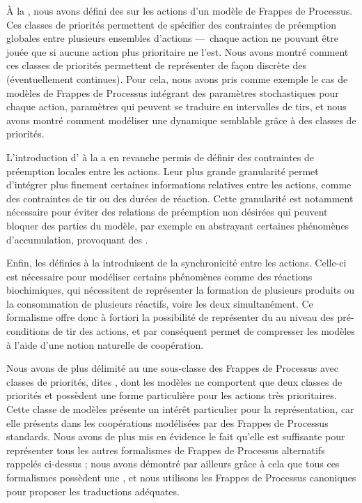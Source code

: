 À la , nous avons défini des  sur les actions
d'un modèle de Frappes de Processus.
Ces classes de priorités permettent de spécifier des contraintes de préemption globales
entre plusieurs ensembles d'actions ---~chaque action ne pouvant être jouée que si
aucune action plus prioritaire ne l'est.
Nous avons montré comment ces classes de priorités permettent de représenter de façon
discrète des  (éventuellement continues).
Pour cela, nous avons pris comme exemple le cas de modèles de Frappes de Processus intégrant
des paramètres stochastiques pour chaque action,
paramètres qui peuvent se traduire en intervalles de tirs,
et nous avons montré comment modéliser une dynamique semblable grâce à des classes de priorités.

L'introduction d' à la  a en revanche permis de définir
des contraintes de préemption locales entre les actions.
Leur plus grande granularité permet d'intégrer plus finement certaines informations
relatives entre les actions, comme des contraintes de tir ou des durées de réaction.
Cette granularité est notamment nécessaire pour éviter des relations de préemption
non désirées qui peuvent bloquer des parties du modèle,
par exemple en abstrayant certaines phénomènes d'accumulation,
provoquant des .

Enfin, les  définies à la  introduisent de la
synchronicité entre les actions.
Celle-ci est nécessaire pour modéliser certains phénomènes comme des réactions biochimiques,
qui nécessitent de représenter la formation de plusieurs produits ou la consommation de plusieurs
réactifs, voire les deux simultanément.
Ce formalisme offre donc à fortiori la possibilité de représenter du 
au niveau des
pré-conditions de tir des actions, et par conséquent permet de compresser les modèles
à l'aide d'une notion naturelle de coopération.

\myskip

Nous avons de plus délimité au  une sous-classe des Frappes de Processus
avec classes de priorités, dites ,
dont les modèles ne comportent que deux classes de priorités et possèdent une forme particulière
pour les actions très prioritaires.
Cette classe de modèles présente un intérêt particulier pour la représentation,
car elle  présents
dans les coopérations modélisées par des Frappes de Processus standards.
Nous avons de plus mis en évidence le fait qu'elle est suffisante pour représenter tous
les autres formalismes de Frappes de Processus alternatifs rappelés ci-dessus ;
nous avons démontré par ailleurs grâce à cela que tous ces formalismes possèdent
une ,
et nous utilisons les Frappes de Processus canoniques pour proposer
les traductions adéquates.

